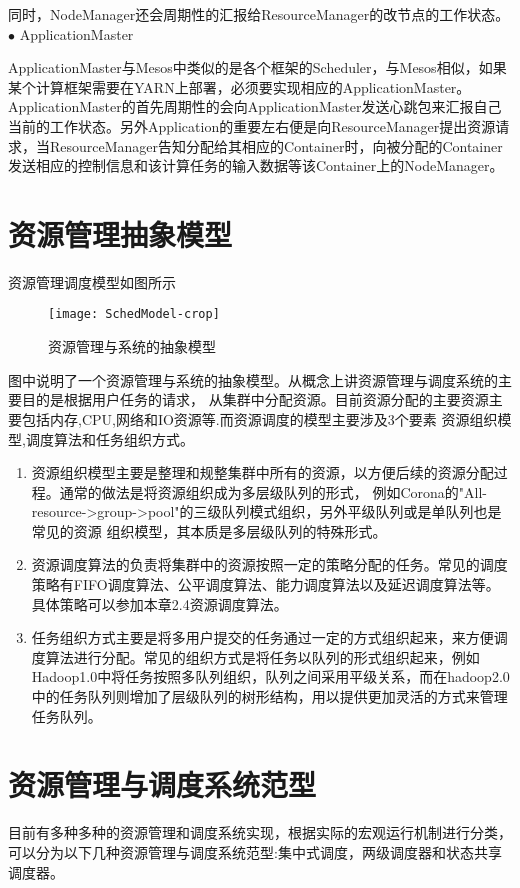 同时，NodeManager还会周期性的汇报给ResourceManager的改节点的工作状态。
$\bullet$ ApplicationMaster

ApplicationMaster与Mesos中类似的是各个框架的Scheduler，与Mesos相似，如果某个计算框架需要在YARN上部署，必须要实现相应的ApplicationMaster。ApplicationMaster的首先周期性的会向ApplicationMaster发送心跳包来汇报自己当前的工作状态。另外Application的重要左右便是向ResourceManager提出资源请求，当ResourceManager告知分配给其相应的Container时，向被分配的Container发送相应的控制信息和该计算任务的输入数据等该Container上的NodeManager。

\section{资源管理抽象模型}
 
资源管理调度模型如图所示
\begin{figure}[htbp]
\centering\texttt{[image: SchedModel-crop]}
\caption{资源管理与系统的抽象模型}\label{fig:SchedModel}
\end{figure}
图中说明了一个资源管理与系统的抽象模型。从概念上讲资源管理与调度系统的主要目的是根据用户任务的请求，
从集群中分配资源。目前资源分配的主要资源主要包括内存,CPU,网络和IO资源等.而资源调度的模型主要涉及3个要素
资源组织模型,调度算法和任务组织方式。
\begin{enumerate}
\item 资源组织模型主要是整理和规整集群中所有的资源，以方便后续的资源分配过程。通常的做法是将资源组织成为多层级队列的形式，
例如Corona的"All-resource->group->pool"的三级队列模式组织，另外平级队列或是单队列也是常见的资源
组织模型，其本质是多层级队列的特殊形式。
\item 资源调度算法的负责将集群中的资源按照一定的策略分配的任务。常见的调度策略有FIFO调度算法、公平调度算法、能力调度算法以及延迟调度算法等。具体策略可以参加本章2.4资源调度算法。
\item 任务组织方式主要是将多用户提交的任务通过一定的方式组织起来，来方便调度算法进行分配。常见的组织方式是将任务以队列的形式组织起来，例如Hadoop1.0中将任务按照多队列组织，队列之间采用平级关系，而在hadoop2.0中的任务队列则增加了层级队列的树形结构，用以提供更加灵活的方式来管理任务队列。
\end{enumerate}
\section{资源管理与调度系统范型}
目前有多种多种的资源管理和调度系统实现，根据实际的宏观运行机制进行分类，可以分为以下几种资源管理与调度系统范型:集中式调度，两级调度器和状态共享调度器。

